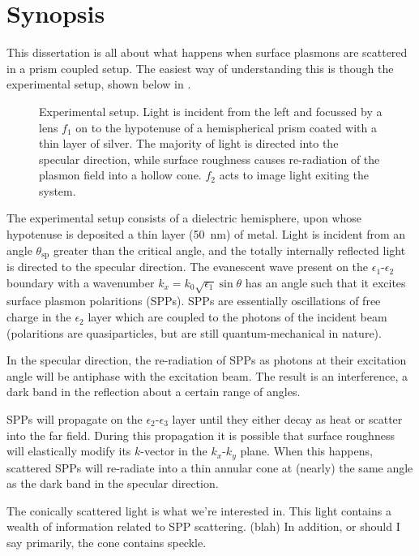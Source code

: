 \documentclass[a4paper,titlepage,onecolumn]{report}
\begin{document}
\section{Synopsis}
This dissertation is all about what happens when surface plasmons are
scattered in a prism coupled setup.  The easiest way of understanding this
is though the experimental setup, shown below in .  
\begin{figure}[hb]
\centering

\vspace{-1cm}
\caption{
Experimental setup.  Light is incident from the left and focussed by a lens
$f_1$ on to the hypotenuse of a hemispherical prism coated with a thin
layer of silver.  The majority of light is directed into the specular
direction, while surface roughness causes re-radiation of the plasmon field
into a hollow cone.  $f_2$ acts to image light exiting the system.
} 
\label{fig:kretschmanngeo} 
\end{figure}
The experimental setup consists of a dielectric hemisphere, upon whose
hypotenuse is deposited a thin layer (\SI{50}{\nano\meter}) of metal.
Light is incident from an angle $\theta_\text{sp}$ greater than the critical angle,
and the totally internally reflected light is directed to the specular
direction.  The evanescent wave present on the $\epsilon_1$-$\epsilon_2$
boundary with a wavenumber $k_x = k_0\sqrt{\epsilon_1}\sin \theta$ has an
angle such that it excites surface plasmon polaritions (SPPs).  SPPs are
essentially oscillations of free charge in the $\epsilon_2$ layer which are
coupled to the photons of the incident beam (polaritions are
quasiparticles, but are still quantum-mechanical in nature).  

In the specular direction, the re-radiation of SPPs as photons at their
excitation angle will be antiphase with the excitation beam.  The result is
an interference, a dark band in the reflection about a certain range of
angles.

SPPs will propagate on the $\epsilon_2$-$\epsilon_3$ layer until they
either decay as heat or scatter into the far field.  During this
propagation it is possible that surface roughness will elastically modify
its $k$-vector in the $k_x$-$k_y$ plane.  When this happens, scattered SPPs
will re-radiate into a thin annular cone at (nearly) the same angle as the
dark band in the specular direction.

The conically scattered light is what we're interested in.  This light
contains a wealth of information related to SPP scattering.  (blah) In
addition, or should I say primarily, the cone contains speckle.
\end{document}
